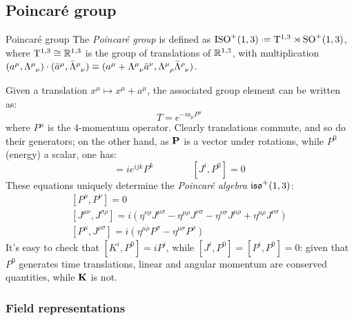 \newpage

\subsection{Poincaré group}

\begin{definition}{Poincaré group}{}
  The \textit{Poincaré group} is defined as $ \pog \defeq \mathrm{T}^{1,3} \rtimes \lorg $, where $ \mathrm{T}^{1,3} \cong \mathbb{R}^{1,3} $ is the group of translations of $ \mathbb{R}^{1,3} $, with multiplication $ (a^\mu, \tensor{\Lambda}{^\mu_\nu}) \cdot (\bar{a}^\mu, \tensor{\bar{\Lambda}}{^\mu_\nu}) \equiv (a^\mu + \tensor{\Lambda}{^\mu_\nu} \bar{a}^\nu, \tensor{\Lambda}{^\mu_\rho} \tensor{\bar{\Lambda}}{^\rho_\nu}) $.
\end{definition}

Given a translation $ x^\mu \mapsto x^\mu + a^\mu $, the associated group element can be written as:
\begin{equation}
  T = e^{-i a_\mu P^\mu}
  \label{eq:1.49}
\end{equation}
where $ P^\mu $ is the 4-momentum operator. Clearly translations commute, and so do their generators; on the other hand, as $ \mathbf{P} $ is a vector under rotations, while $ P^0 $ (energy) a scalar, one has:
\begin{equation*}
  [J^i,P^j] = i e^{ijk} P^k
  \qquad \qquad
  [J^i,P^0] = 0
\end{equation*}
These equations uniquely determine the \textit{Poincaré algebra} $ \mathfrak{iso}^+(1,3) $:
\begin{equation}
  \begin{gathered}
    [P^\mu,P^\nu] = 0 \\
    [J^{\mu \nu}, J^{\sigma \rho}] = i \left( \eta^{\nu \rho} J^{\mu \sigma} - \eta^{\mu \rho} J^{\nu \sigma} - \eta^{\nu \sigma} J^{\mu \rho} + \eta^{\mu \rho} J^{\nu \sigma} \right) \\
    [P^\mu,J^{\rho \sigma}] = i \left( \eta^{\mu \rho} P^\sigma - \eta^{\mu \sigma} P^\rho \right)
  \end{gathered}
  \label{eq:1.50}
\end{equation}
It's easy to check that $ [K^i,P^0] = i P^i $, while $ [J^i,P^0] = [P^i,P^0] = 0 $: given that $ P^0 $ generates time translations, linear and angular momentum are conserved quantities, while $ \mathbf{K} $ is not.

\subsubsection{Field representations}

